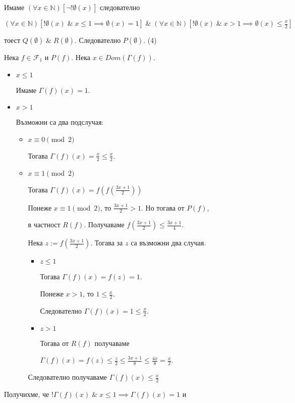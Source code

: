\documentclass{article}
\begin{document}
Имаме \((\forall x \in \mathbb{N})[\lnot!\emptyset(x)]\) следователно

\((\forall x \in \mathbb{N})[!\emptyset(x) \; \& \; x \leq 1 \implies \emptyset(x) = 1] \; \& \; (\forall x \in \mathbb{N})\left[!\emptyset(x) \; \& \; x > 1 \implies \emptyset(x) \leq \displaystyle\frac{x}{2}\right]\)

тоест \(Q(\emptyset) \; \& \; R(\emptyset)\). Следователно \(P(\emptyset)\). (4)

Нека \(f \in \mathcal{F}_1\) и \(P(f)\). Нека \(x \in Dom(\Gamma(f))\).
\begin{itemize}
\item \(x \leq 1\)

Имаме \(\Gamma(f)(x) = 1\).

\item \(x > 1\)

Възможни са два подслучая:

\begin{itemize}
\item \(x \equiv 0 \pmod{2}\)

Тогава \(\Gamma(f)(x) = \displaystyle\frac{x}{2} \leq \displaystyle\frac{x}{2}\).

\item \(x \equiv 1 \pmod{2}\)

Тогава \(\Gamma(f)(x) = \displaystyle{f\left(f\left(\frac{3x + 1}{2}\right)\right)}\)

Понеже \(x \equiv 1 \pmod{2}\), то \(\displaystyle\frac{3x + 1}{2} > 1\). Но тогава от \(P(f)\),

в частност \(R(f)\). Получаваме \(\displaystyle{f\left(\frac{3x + 1}{2}\right)} \leq \frac{3x + 1}{4}\).

Нека \(z := \displaystyle{f\left(\frac{3x + 1}{2}\right)}\). Тогава за \(z\) са възможни два случая.

\begin{itemize}
\item \(z \leq 1\)

Тогава \(\Gamma(f)(x) = f(z) = 1\).

Понеже \(x > 1\), то \(1 \leq \displaystyle\frac{x}{2}\).

Следователно \(\Gamma(f)(x) = 1 \leq \displaystyle\frac{x}{2}\).

\item \(z > 1\)

Тогава от \(R(f)\) получаваме

\(\Gamma(f)(x) = f(z) \leq \displaystyle\frac{z}{2} \leq \displaystyle\frac{3x  + 1}{8} \leq \displaystyle\frac{4x}{8} = \displaystyle\frac{x}{2}\).
\end{itemize}
Следователно получаваме \(\Gamma(f)(x) \leq \displaystyle\frac{x}{2}\)
\end{itemize}
\end{itemize}
Получихме, че \(!\Gamma(f)(x) \; \& \; x \leq 1 \implies \Gamma(f)(x) = 1\) и 
\end{document}
